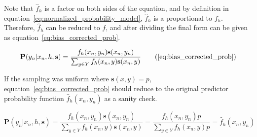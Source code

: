\documentclass[twoside]{article}
\begin{document}
\begin{appendices}
Note that \(\hat{f}_h\) is a factor on both sides of the equation, and by definition  in equation~\eqref{eq:normalized_probability_model}, \(\hat{f}_h\) is a proportional to \(f_h\). Therefore, \(\hat{f}_h\) can be reduced to \(f\), and after dividing the final form can be given as equation~\eqref{eq:bias_corrected_prob}.

\begin{equation}
\mathbf{P}(y_n|x_n,h,\mathbf{s})=\dfrac{f_h(x_n,y_n)\mathbf{s}(x_n,y_n)}{\sum_{y \in Y}f_h(x_n,y)\mathbf{s}(x_n,y)}
\tag{\ref{eq:bias_corrected_prob}}
\end{equation}

If the sampling was uniform where \(\mathbf{s}(x,y)=p\), equation~\eqref{eq:bias_corrected_prob} should reduce to the original predictor probability function \(\hat{f}_h(x_n,y_n)\) as a sanity check.

\[\mathbf{P}(y_n|x_n,h,\mathbf{s})=\frac{f_h(x_n,y_n)\mathbf{s}(x_n,y_n)}{\sum_{y \in Y}f_h(x_n,y)\mathbf{s}(x_n,y)}=\frac{f_h(x_n,y_n)p}{\sum_{y \in Y}f_h(x_n,y)p} =\hat{f}_h(x_n,y_n)\]

\end{appendices}

\end{document}
